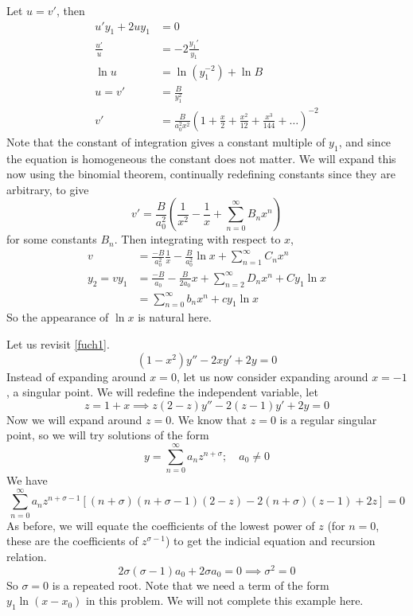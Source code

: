 \begin{example}
\begin{itemize}
\[			\]
			Let \(u=v'\), then
			\begin{align*}
				u'y_1 + 2uy_1 & = 0                                                                                                  \\
				\frac{u'}{u}  & = -2\frac{y_1'}{y_1}                                                                                 \\
				\ln u         & = \ln(y_1^{-2}) + \ln B                                                                              \\
				u = v'        & = \frac{B}{y_1^2}                                                                                    \\
				v'            & = \frac{B}{a_0^2 x^2} \left( 1 + \frac{x}{2} + \frac{x^2}{12} + \frac{x^3}{144} + \dots \right)^{-2}
			\end{align*}
			Note that the constant of integration gives a constant multiple of \(y_1\), and since the equation is homogeneous the constant does not matter.
			We will expand this now using the binomial theorem, continually redefining constants since they are arbitrary, to give
			\[
				v' = \frac{B}{a_0^2}\left( \frac{1}{x^2} - \frac{1}{x} + \sum_{n=0}^\infty B_n x^n \right)
			\]
			for some constants \(B_n\).
			Then integrating with respect to \(x\),
			\begin{align*}
				v          & = \frac{-B}{a_0^2}\frac{1}{x} - \frac{B}{a_0^2}\ln x + \sum_{n=1}^\infty C_n x^n \\
				y_2 = vy_1 & = \frac{-B}{a_0} - \frac{B}{2a_0}x + \sum_{n=2}^\infty D_n x^n + Cy_1\ln x       \\
							& = \sum_{n=0}^\infty b_n x^n + cy_1\ln x
			\end{align*}
			So the appearance of \(\ln x\) is natural here.
	\end{itemize}
\end{example}
\begin{example}
	Let us revisit \eqref{fuch1}.
	\[
		(1-x^2)y'' - 2xy' + 2y = 0
	\]
	Instead of expanding around \(x=0\), let us now consider expanding around \(x=-1\), a singular point.
	We will redefine the independent variable, let
	\[
		z = 1 + x \implies z(2-z)y'' - 2(z-1)y' + 2y = 0
	\]
	Now we will expand around \(z=0\).
	We know that \(z=0\) is a regular singular point, so we will try solutions of the form
	\[
		y = \sum_{n=0}^\infty a_n z^{n+\sigma};\quad a_0 \neq 0
	\]
	We have
	\[
		\sum_{n=0}^\infty a_n z^{n+\sigma-1}\left[ (n+\sigma)(n+\sigma-1)(2-z) - 2(n+\sigma)(z-1) + 2z \right] = 0
	\]
	As before, we will equate the coefficients of the lowest power of \(z\) (for \(n=0\), these are the coefficients of \(z^{\sigma - 1}\)) to get the indicial equation and recursion relation.
	\[
		2\sigma(\sigma - 1)a_0 + 2\sigma a_0 = 0 \implies \sigma^2 = 0
	\]
	So \(\sigma = 0\) is a repeated root.
	Note that we need a term of the form \(y_1\ln (x-x_0)\) in this problem.
	We will not complete this example here.
\end{example}
